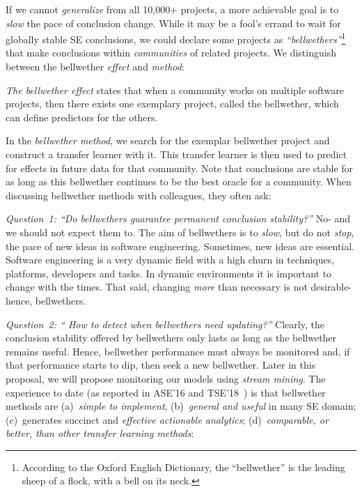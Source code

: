 If we cannot {\em generalize} 
from all 10,000+ projects, a more achievable goal is to {\em
slow} the pace of conclusion change.
While it may be
a fool's errand  to wait for   globally stable SE
conclusions, we could declare some  projects as    {\em ``bellwethers''}\footnote{ According to the Oxford English Dictionary, the
``bellwether'' is the leading sheep of a flock, with a bell on its neck.} that make conclusions 
within {\em communities} of related projects.
We  distinguish between the bellwether {\em effect}
and {\em  method}:
\bi
\item \textit{The bellwether effect} states that when a community works on 
multiple software projects, then  there exists one exemplary project, called the bellwether,
which can define   predictors for the others.
\item In the \textit{bellwether method}, we search for the exemplar bellwether project and construct a transfer learner with it. This transfer learner is then used to predict for effects in future data for that community.
\ei
 Note that conclusions are stable
for as long as this bellwether continues to be the best oracle for a community. 
When discussing bellwether methods with colleagues, they often ask:
\bi
\item
{\em Question~1: ``Do bellwethers guarantee permanent conclusion stability?''} No- and we should not expect them to. The aim of bellwethers is to {\em slow}, but do not  {\em stop}, the pace of new ideas in software engineering. Sometimes, new ideas are essential. Software engineering is a very dynamic field with a high churn in techniques, platforms, developers and tasks. In  dynamic environments it is important to change with the times. That said, changing {\em more} than necessary is not desirable- hence, bellwethers. 
\item
{\em Question~2: `` How to detect when bellwethers need updating?''} 
Clearly, the conclusion stability offered by bellwethers only lasts as long as the bellwether remains useful. Hence, bellwether performance must always be monitored and, if that performance starts to dip, then seek a new bellwether. Later in this proposal, we will propose monitoring our models using {\em stream mining}. 
\ei
The experience to date (as reported in ASE'16 and TSE'18~\cite{KrishnaMF16,krishna2018bellwethers}) is that 
bellwether methods are (a)~{\em simple to implement},
(b)~{\em general and useful} in many SE domain;
 (c)~generates succinct and {\em effective actionable analytics};
(d)~{\em comparable, or better,
than   other 
transfer learning methods}:

